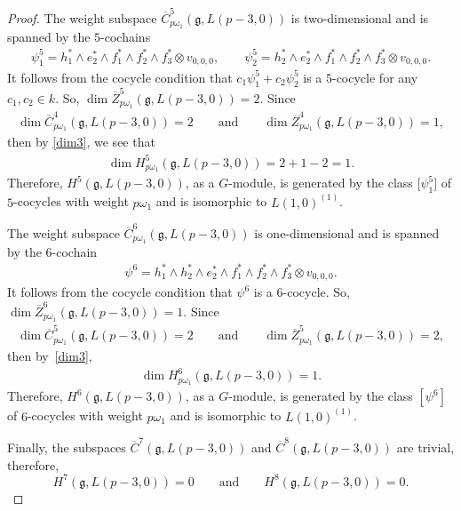\documentclass[10pt,a4paper]{amsart}
\numberwithin{equation}{section}
\begin{document}
\begin{proof}
The weight subspace
$\overline{C}^5_{p\omega_1}(\mathfrak{g},L(p-3,0))$ is two-dimensional and is spanned by the $5$-cochains
\begin{gather*}
\psi^5_1=h_1^*\wedge e_2^*\wedge f_1^*\wedge f_2^*\wedge f_3^*\otimes v_{0,0,0},\qquad\psi^5_2=h_2^*\wedge e_2^*\wedge f_1^*\wedge f_2^*\wedge f_3^*\otimes v_{0,0,0}.
\end{gather*}
It follows from the cocycle condition that $c_1\psi^5_1+c_2\psi^5_2$ is a $5$-cocycle for any $c_1,c_2\in k$. So, $\dim \overline{Z}^5_{p\omega_1}(\mathfrak{g},L(p-3,0))=2$. Since
\begin{gather*}
\dim \overline{C}^4_{p\omega_1}(\mathfrak{g},L(p-3,0))=2\qquad\text{and}\qquad
\dim \overline{Z}^4_{p\omega_1}(\mathfrak{g},L(p-3,0))=1,
\end{gather*}
then by \eqref{dim3}, we see that
\begin{gather*}
\dim H^5_{p\omega_1}(\mathfrak{g},L(p-3,0))=2+1-2=1.
\end{gather*}
Therefore, $H^5(\mathfrak{g},L(p-3,0))$, as a $G$-module, is generated by the class $\big[\psi^5_1\big]$ of $5$-cocycles with weight $p\omega_1$ and is isomorphic to $L(1,0)^{(1)}$.

The weight subspace
$\overline{C}^6_{p\omega_1}(\mathfrak{g},L(p-3,0))$ is one-dimensional and is spanned by the $6$-cochain
\begin{gather*}
\psi^6=h_1^*\wedge h_2^*\wedge e_2^*\wedge f_1^*\wedge f_2^*\wedge f_3^*\otimes v_{0,0,0}.
\end{gather*}
It follows from the cocycle condition that $\psi^6$ is a $6$-cocycle. So, $\dim \overline{Z}^6_{p\omega_1}(\mathfrak{g},L(p-3,0))=1$. Since
\begin{gather*}
\dim \overline{C}^5_{p\omega_1}(\mathfrak{g},L(p-3,0))=2\qquad\text{and}\qquad
\dim \overline{Z}^5_{p\omega_1}(\mathfrak{g},L(p-3,0))=2,
\end{gather*}
then by~\eqref{dim3},
\begin{gather*}
\dim H^6_{p\omega_1}(\mathfrak{g},L(p-3,0))=1.
\end{gather*}
Therefore, $H^6(\mathfrak{g},L(p-3,0))$, as a $G$-module, is generated by the class $[\psi^6]$ of $6$-cocycles with weight $p\omega_1$ and is isomorphic to $L(1,0)^{(1)}$.

Finally, the subspaces $\overline{C}^7(\mathfrak{g},L(p-3,0))$ and $\overline{C}^8(\mathfrak{g},L(p-3,0))$ are trivial, therefore,
\begin{equation*}
H^7(\mathfrak{g},L(p-3,0))=0\qquad\text{and}\qquad H^8(\mathfrak{g},L(p-3,0))=0.
\end{equation*}
\renewcommand{\qed}{}
\end{proof}
\end{document}
